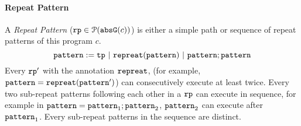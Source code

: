 \paragraph{Repeat Pattern}
A \emph{Repeat Pattern} ($\mathtt{rp} \in \mathcal{P}({\mathtt{abs}{\mathtt{G}}(c)})$) is either a simple path or sequence of repeat patterns of this program $c$. 
\[
  \mathtt{pattern} := \mathtt{tp} ~|~ \mathtt{repreat}(\mathtt{pattern}) ~|~ \mathtt{pattern}; \mathtt{pattern}
\]
Every $\mathtt{rp}'$ with the annotation $\mathtt{repreat}$, (for example, $\mathtt{pattern} = \mathtt{repreat}(\mathtt{pattern}')$)
can consecutively execute at least twice.
Every two sub-repeat patterns following each other in a $\mathtt{rp}$ can execute in sequence, for example in $\mathtt{pattern} = \mathtt{pattern}_1; \mathtt{pattern}_2$,
$\mathtt{pattern}_2$ can execute after $\mathtt{pattern}_1$.
Every sub-repeat patterns in the sequence are distinct.
%

